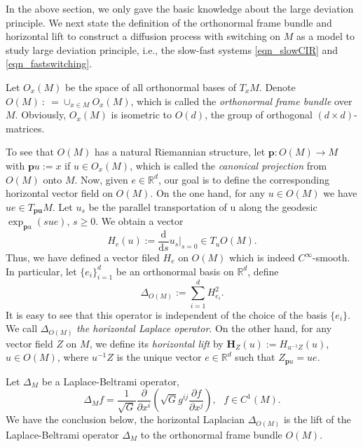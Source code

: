 \documentclass[a4paper]{article}
\numberwithin{equation}{section}
\theoremstyle{definition}
\begin{document}
In the above section, we only gave the basic knowledge about the large deviation principle. We next state the definition of the orthonormal frame bundle and horizontal lift to construct a diffusion process with switching on $M$ as a model to study large deviation principle, i.e., the slow-fast systems \eqref{eqn_slowCIR} and \eqref{eqn_fastswitching}.
\par
Let $O_x(M)$ be the space of all orthonormal bases of $T_xM$. Denote
$O(M)~:~=\cup_{x\in M} O_x(M)$, which is called the \textit{orthonormal frame bundle} over $M$. Obviously, $O_x(M)$ is isometric to $O(d)$, the group of orthogonal $(d \times d)$-matrices.  
\par
To see that $O(M)$ has a natural Riemannian structure, let $\mathbf{p}: O(M)\to M$ with $\mathbf{p}u := x$ if $u\in O_x(M)$, which is called the \textit{canonical projection} from $O(M)$ onto $M$.
Now, given $e\in \mathbb{R}^d$, our goal is to define the corresponding horizontal vector field on $O(M)$. On the one hand, for any $u \in O(M)$ we have $ue \in T_{\mathbf{pu}}M$. Let $u_s$ be the parallel transportation of u along the geodesic $\exp_{\mathbf{p}u}(sue)$, $s \geq 0$. We obtain a vector 
\begin{equation*}H_e (u):=\frac{\mathrm{d}}{\mathrm{d}s} u_s|_{s=0} \in T_u O(M).
\end{equation*} Thus, we have defined a vector filed $H_e$ on $O(M)$ which is indeed $C^\infty$-smooth. In particular, let $\{e_i\}_{i=1}^d$ be an orthonormal basis on $\mathbb{R}^d$, deﬁne
\begin{equation*}
\Delta_{O(M)}:=\sum^{d}_{i=1}H^2_{e_i}.
\end{equation*}
It is easy to see that this operator is independent of the choice of the basis $\{e_i\}$. We call $\Delta_{O(M)}$ \textit{the horizontal Laplace operator}. On the other hand, for any vector field $Z$ on $M$, we define its \textit{horizontal lift} by $\mathbf{H}_{Z}(u):=H_{u^{-1}Z}(u)$, $u\in O(M)$, where $u^{-1}Z$ is the unique vector $e\in \mathbb{R}^d$ such that $Z_{\mathbf{p}u}=ue$.
\par
Let $\Delta_M$ be a Laplace-Beltrami operator,
\begin{equation}\label{eqn_Laplace_Beltrami_operator}
	\Delta_M f=\frac{1}{\sqrt{G}}\frac{\partial}{\partial x^i}\left(\sqrt{G} g^{ij}\frac{\partial f}{\partial x^j} \right),~~~f\in C^1(M).
\end{equation}
We have the conclusion below, the horizontal Laplacian $\Delta_{O(M)}$ is the lift of the Laplace-Beltrami operator $\Delta_M$ to the orthonormal frame bundle $O(M)$. 
\end{document}
